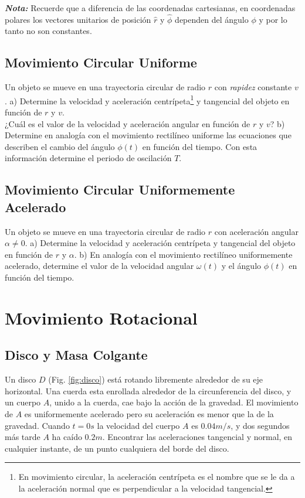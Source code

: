 \documentclass{replab}
\begin{document}
\textit{\textbf{Nota:}} Recuerde que a diferencia de las coordenadas cartesianas, en coordenadas polares los vectores unitarios de posición $\hat{r}$ y $\hat{\phi}$ dependen del ángulo $\phi$ y por lo tanto no son constantes.

\subsection{Movimiento Circular Uniforme}
Un objeto se mueve en una trayectoria circular de radio $r$ con \textit{rapidez} constante $v$. a) Determine la velocidad y aceleración centrípeta\footnote{En movimiento circular, la aceleración centrípeta es el nombre que se le da a la aceleración normal que es perpendicular a la velocidad tangencial.} y tangencial del objeto en función de $r$ y $v$.\\ 

¿Cuál es el valor de la velocidad y aceleración angular en función de $r$ y $v$? b) Determine en analogía con el movimiento rectilíneo uniforme las ecuaciones que describen el cambio del ángulo $\phi(t)$ en función del tiempo. Con esta información determine el periodo de oscilación $T$.\\

\subsection{Movimiento Circular Uniformemente Acelerado}
	Un objeto se mueve en una trayectoria circular de radio $r$ con aceleración angular $\alpha \neq 0$. a) Determine la velocidad y aceleración centrípeta y tangencial del objeto en función de $r$ y $\alpha$. b) En analogía con el movimiento rectilíneo uniformemente acelerado, determine el valor de la velocidad angular $\omega(t)$ y el ángulo $\phi(t)$ en función del tiempo.

\section{Movimiento Rotacional}

\subsection{Disco y Masa Colgante}
Un disco  $D$ (Fig. \ref{fig:disco}) está rotando libremente alrededor de su eje horizontal. Una cuerda esta enrollada alrededor de la circunferencia del disco, y un cuerpo $A$, unido a la cuerda, cae bajo la acción de la gravedad. El movimiento de $A$ es uniformemente acelerado pero su aceleración es menor que la de la gravedad. Cuando $t=0s$ la velocidad del cuerpo $A$ es $0.04m/s$, y dos segundos más tarde $A$ ha caído $0.2m$. Encontrar las aceleraciones tangencial y normal, en cualquier instante, de un punto cualquiera del borde del disco.
\end{document}
